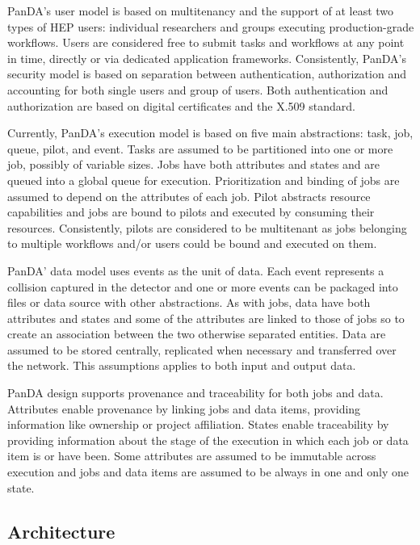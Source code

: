 PanDA's user model is based on multitenancy and the support of at least two
types of HEP users: individual researchers and groups executing production-grade
workflows. Users are considered free to submit tasks and workflows at any point
in time, directly or via dedicated application frameworks. Consistently, PanDA's
security model is based on separation between authentication, authorization and
accounting for both single users and group of users. Both authentication and
authorization are based on digital certificates and the X.509 standard.

Currently, PanDA's execution model is based on five main abstractions: task,
job, queue, pilot, and event. Tasks are assumed to be partitioned into one or
more job, possibly of variable sizes. Jobs have both attributes and states and
are queued into a global queue for execution. Prioritization and binding of jobs
are assumed to depend on the attributes of each job. Pilot abstracts resource
capabilities and jobs are bound to pilots and executed by consuming their
resources. Consistently, pilots are considered to be multitenant as jobs
belonging to multiple workflows and/or users could be bound and executed on
them.

PanDA' data model uses events as the unit of data. Each event represents a
collision captured in the detector and one or more events can be packaged into
files or data source with other abstractions. As with jobs, data have both
attributes and states and some of the attributes are linked to those of jobs so
to create an association between the two otherwise separated entities. Data are
assumed to be stored centrally, replicated when necessary and transferred over
the network. This assumptions applies to both input and output data.

PanDA design supports provenance and traceability for both jobs and data.
Attributes enable provenance by linking jobs and data items, providing
information like ownership or project affiliation. States enable traceability by
providing information about the stage of the execution in which each job or data
item is or have been. Some attributes are assumed to be immutable across
execution and jobs and data items are assumed to be always in one and only one
state.

\subsection{Architecture}

